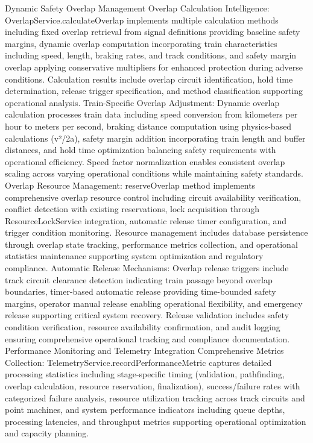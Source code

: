 Dynamic Safety Overlap Management
Overlap Calculation Intelligence: OverlapService.calculateOverlap implements multiple calculation methods including fixed overlap retrieval from signal definitions providing baseline safety margins, dynamic overlap computation incorporating train characteristics including speed, length, braking rates, and track conditions, and safety margin overlap applying conservative multipliers for enhanced protection during adverse conditions. Calculation results include overlap circuit identification, hold time determination, release trigger specification, and method classification supporting operational analysis.
Train-Specific Overlap Adjustment: Dynamic overlap calculation processes train data including speed conversion from kilometers per hour to meters per second, braking distance computation using physics-based calculations (v²/2a), safety margin addition incorporating train length and buffer distances, and hold time optimization balancing safety requirements with operational efficiency. Speed factor normalization enables consistent overlap scaling across varying operational conditions while maintaining safety standards.
Overlap Resource Management: reserveOverlap method implements comprehensive overlap resource control including circuit availability verification, conflict detection with existing reservations, lock acquisition through ResourceLockService integration, automatic release timer configuration, and trigger condition monitoring. Resource management includes database persistence through overlap state tracking, performance metrics collection, and operational statistics maintenance supporting system optimization and regulatory compliance.
Automatic Release Mechanisms: Overlap release triggers include track circuit clearance detection indicating train passage beyond overlap boundaries, timer-based automatic release providing time-bounded safety margins, operator manual release enabling operational flexibility, and emergency release supporting critical system recovery. Release validation includes safety condition verification, resource availability confirmation, and audit logging ensuring comprehensive operational tracking and compliance documentation.
Performance Monitoring and Telemetry Integration
Comprehensive Metrics Collection: TelemetryService.recordPerformanceMetric captures detailed processing statistics including stage-specific timing (validation, pathfinding, overlap calculation, resource reservation, finalization), success/failure rates with categorized failure analysis, resource utilization tracking across track circuits and point machines, and system performance indicators including queue depths, processing latencies, and throughput metrics supporting operational optimization and capacity planning.
